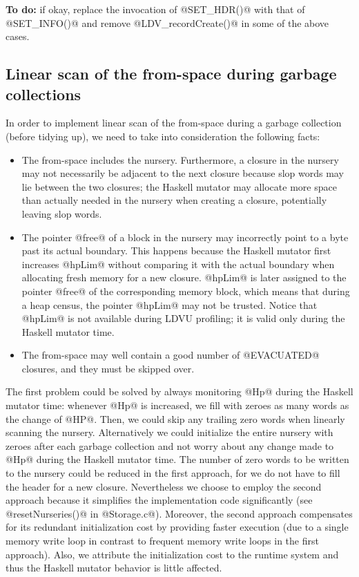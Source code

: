 \documentclass{article}
\begin{document}
\textbf{To do:} if okay, replace the invocation of @SET_HDR()@ with that of 
@SET_INFO()@ and remove @LDV_recordCreate()@ in some of the above cases. 

\subsection{Linear scan of the from-space during garbage collections}

In order to implement linear scan of the from-space during a garbage collection 
(before tidying up),
we need to take into consideration the following facts:

\begin{itemize}
\item The from-space includes the nursery. 
Furthermore, a closure in the nursery may not necessarily be adjacent to the next 
closure because slop words may lie between the two closures;
the Haskell mutator may allocate more space than actually needed in the
nursery when creating a closure, potentially leaving slop words. 

\item The pointer @free@ of a block in the nursery may incorrectly point to
a byte past its actual boundary.
This happens because 
the Haskell mutator first increases @hpLim@ without comparing it with the
actual boundary when allocating fresh memory for a new closure.
@hpLim@ is later assigned to the pointer @free@ of the corresponding memory
block, which means that during a heap census, the pointer @hpLim@ may not
be trusted. 
Notice that @hpLim@ is not available during LDVU profiling; it is valid
only during the Haskell mutator time.

\item The from-space may well contain a good number of @EVACUATED@ closures,
and they must be skipped over.
\end{itemize}

The first problem could be solved by always monitoring @Hp@ during the Haskell
mutator time: whenever @Hp@ is increased, we fill with zeroes 
as many words as the change of @HP@. Then, we could skip any trailing 
zero words when linearly scanning the nursery.
Alternatively we could initialize the entire nursery with zeroes after
each garbage collection and not worry about any change made to @Hp@ during the
Haskell mutator time. 
The number of zero words to be written to the nursery could be reduced
in the first approach, for we do not have to fill the header for a new closure.
Nevertheless we choose to employ the second approach because
it simplifies the implementation code significantly 
(see @resetNurseries()@ in @Storage.c@). 
Moreover, the second approach compensates for its redundant initialization cost
by providing faster execution (due to a single memory write loop in contrast
to frequent memory write loops in the first approach).
Also, we attribute the initialization cost to the runtime system and thus 
the Haskell mutator behavior is little affected. 
\end{document}
